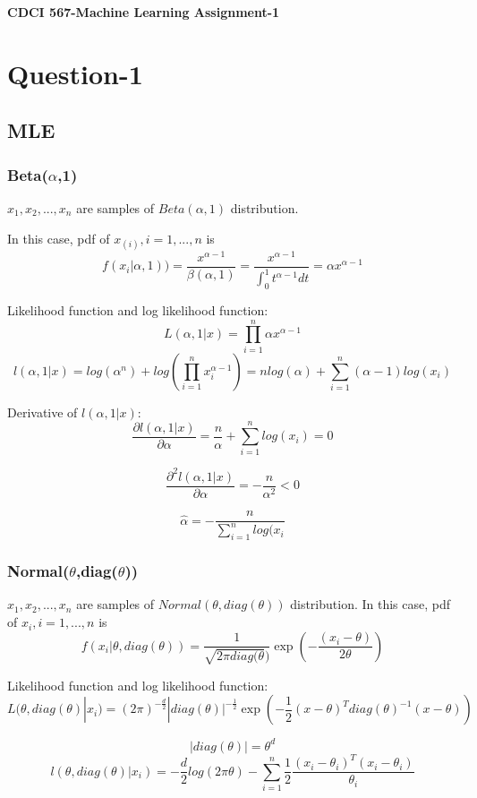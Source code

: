 \documentclass[11pt]{article}
\begin{document}
	\begin{center}
		\Large\textbf{CDCI 567-Machine Learning Assignment-1}
	\end{center}
	\section{Question-1}
	\subsection{MLE}
	\subsubsection{Beta($\alpha$,1)}
	$x_{1},x_{2},...,x_{n}$ are samples of $Beta(\alpha,1)$ distribution.
	
	In this case, pdf of $x_(i), i=1,...,n$ is $$f(x_{i}|\alpha,1))=\frac{x^{\alpha-1}}{\beta(\alpha,1)}=
	\frac{x^{\alpha-1}}{\int_{0}^{1}t^{\alpha-1}dt}=
	\alpha x^{\alpha-1}$$
	
	Likelihood function and log likelihood function:
	$$L(\alpha,1|x)=\prod_{i=1}^{n}\alpha x^{\alpha-1}$$
	$$l(\alpha,1|x)=log(\alpha^{n}) + log(\prod_{i=1}^{n}x_{i}^{\alpha-1})=
	nlog(\alpha) + \sum_{i=1}^{n}(\alpha-1)log(x_{i})$$
	
	Derivative of $l(\alpha,1|x)$:
	$$\frac{\partial l(\alpha,1|x)}{\partial \alpha} = \frac{n}{\alpha} + \sum_{i=1}^{n}log(x_{i})=0$$
	
	$$\frac{\partial^{2} l(\alpha,1|x)}{\partial \alpha} = -\frac{n}{\alpha^{2}} < 0$$
	
	$$\hat{\alpha} = -\frac{n}{\sum_{i=1}^{n}log(x_{i}}$$
	\subsubsection{Normal($\theta$,diag($\theta$))}
	$x_{1},x_{2},...,x_{n}$ are samples of $Normal(\theta,diag(\theta))$ distribution.
	In this case, pdf of $x_{i}, i = 1,...,n$ is
	$$f(x_{i}|\theta,diag(\theta)) = \frac{1}{\sqrt{2\pi diag(\theta})}\exp(-\frac{(x_{i}-\theta)}{2\theta})$$
	
	Likelihood function and log likelihood function:
	$$L(\theta,diag(\theta)|x_{i}) = (2\pi)^{-\frac{d}{2}}|diag(\theta)|^{-\frac{1}{2}}\exp(-\frac{1}{2}(x-\theta)^{T}diag(\theta)^{-1}(x-\theta))$$	
	
	$$|diag(\theta)| = \theta^{d}$$
	$$l(\theta,diag(\theta)|x_{i}) = -\frac{d}{2}log(2\pi\theta) - \sum_{i=1}^{n}\frac{1}{2} \frac{(x_{i}-\theta_{i})^{T}(x_{i}-\theta_{i})}{\theta_{i}}$$
	
\end{document}
